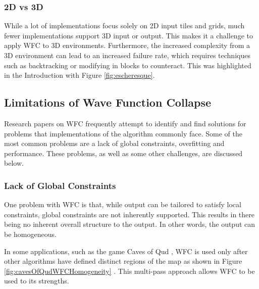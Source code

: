 \subsubsection{2D vs 3D}
While a lot of implementations focus solely on 2D input tiles and grids, much fewer implementations support 3D input or output. This makes it a challenge to apply WFC to 3D environments. Furthermore, the increased complexity from a 3D environment can lead to an increased failure rate, which requires techniques such as backtracking or modifying in blocks to counteract. This was highlighted in the Introduction with Figure \ref{fig:escheresque}.

\subsection{Limitations of Wave Function Collapse}
Research papers on WFC frequently attempt to identify and find solutions for problems that implementations of the algorithm commonly face. Some of the most common problems are a lack of global constraints, overfitting and performance. These problems, as well as some other challenges, are discussed below.


\subsubsection{Lack of Global Constraints}
One problem with WFC is that, while output can be tailored to satisfy local constraints, global constraints are not inherently supported. This results in there being no inherent overall structure to the output. In other words, the output can be homogeneous.

In some applications, such as the game Caves of Qud \cite{cavesofqud}, WFC is used only after other algorithms have defined distinct regions of the map as shown in Figure \ref{fig:cavesOfQudWFCHomogeneity} \cite{WFC_ConstraintSolving_and_ML, WFC_Design_Constraints, GDC_caves_of_qud}. This multi-pass approach allows WFC to be used to its strengths.

